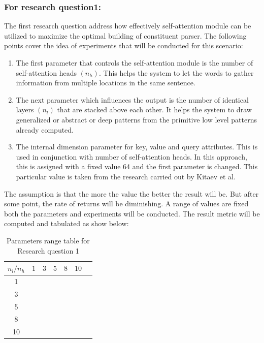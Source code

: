 \documentclass[a4paper, 11pt]{article}
\begin{document}
\subsubsection{For research question1:}
The first research question address how effectively self-attention module can be utilized to maximize the optimal building of constituent parser. The following points cover the idea of experiments that will be conducted for this scenario:
\begin{enumerate}
\item The first parameter that controls the self-attention module is the number of self-attention heads $(n_h)$. This helps the system to let the words to gather information from multiple locations in the same sentence. 
\item The next parameter which influences the output is the number of identical layers $(n_l)$ that are stacked above each other. It helps the system to draw generalized or abstract or deep patterns from the primitive low level patterns already computed. 
\item The internal dimension parameter for key, value and query attributes. This is used in conjunction with number of self-attention heads. In this approach, this is assigned with a fixed value 64 and the first parameter is changed. This particular value is taken from the research carried out by Kitaev et al. \parencite*{Kitaev2019}
\end{enumerate}

The assumption is that the more the value the better the result will be. But after some point, the rate of returns will be diminishing. A range of values are fixed both the parameters and experiments will be conducted. The result metric will be computed and tabulated as show below:

\begin{table}[h!]
  \begin{center}
    \begin{tabular}{c|c|c|c|c|c|c} 
      $n_l/n_h$ & $1$ & $3$ & $5$ & $8$ & $10$\\
      \hline
      1 & & & & & & \\
      \hline
      3 & & & & & \\
      \hline
      5 & & & & & \\
      \hline
      8 & & & & & \\
      \hline
      10 & & & & & \\
    \end{tabular}
    \caption{Parameters range table for Research question 1}
    \label{tab:research_question1_table1}

  \end{center}
\end{table}
\end{document}
